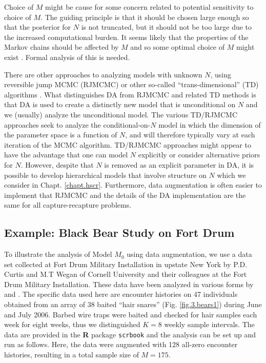 Choice of $M$ might be cause for some concern related
to potential sensitivity to choice of $M$. The guiding principle is
that it should be chosen large enough so that the posterior for $N$ is
not truncated, but it should not be too large due to the increased %
computational burden. It seems likely that the properties of the
Markov chains should be affected by $M$ and so some optimal choice of
$M$ might exist \citep{gopalaswamy_etal:2012}.
Formal analysis of this is needed.

There are other approaches to analyzing models with unknown $N$, using
reversible jump MCMC (RJMCMC) or other so-called ``trans-dimensional''
(TD) algorithms \citep{king_brooks:2001, durban_elston:2005,
  king_etal:2008, schofield_barker:2008, wright_etal:2009}.  What
distinguishes DA from RJMCMC and related TD methods is that DA is used
to create a distinctly new model that is unconditional on $N$ and we
(usually) analyze the unconditional model. The various TD/RJMCMC
approaches seek to analyze the conditional-on-$N$ model in which the
dimension of the parameter space is a function of $N$, and will
therefore typically vary at each iteration of the MCMC
algorithm. TD/RJMCMC approaches might appear to have the advantage
that one can model $N$ explicitly or consider alternative priors for
$N$. However, despite that $N$ is removed as an explicit parameter in
DA, it is possible to develop hierarchical models that involve
structure on $N$ \citep{converse_royle:2010, royle_etal:2011ms} which
we consider in Chapt. \ref{chapt.hscr}. Furthermore, data augmentation
is often easier to implement that RJMCMC and the details of the
DA implementation are the same for all capture-recapture problems.


\subsection{Example: Black Bear Study on Fort Drum}

To illustrate the analysis of Model $M_0$ using data augmentation, we use
a data set collected at Fort Drum Military Installation in upstate New
York by P.D. Curtis and M.T Wegan of Cornell University and
their colleagues at the Fort Drum Military Installation.
These data have been analyzed in various forms by
\citet{wegan:2008,gardner_etal:2009} and \citet{gardner_etal:2010jwm}.
The specific data used here are encounter histories on 47 individuals
obtained from an array of 38 baited ``hair snares''
(Fig. \ref{fig.3.bears1}) during June and July 2006.  Barbed wire
traps were baited and checked for hair samples each week for eight
weeks, thus we distinguished $K=8$ weekly sample intervals. The data are provided
in the {\bf R} package \mbox{\tt scrbook}
and the analysis can be set up and run as
follows. Here, the data were augmented with 128
all-zero encounter histories, resulting in a total sample size of $M=175$.

